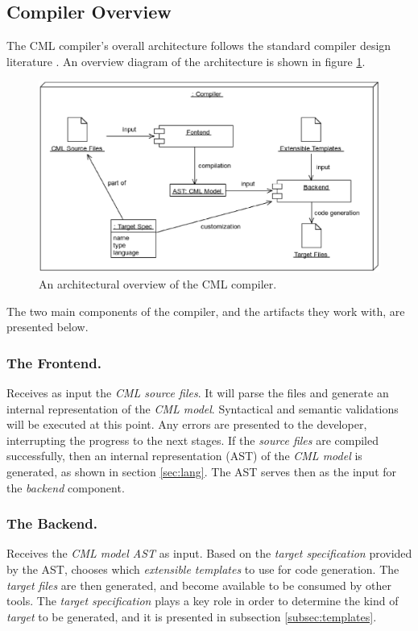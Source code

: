 \subsection{Compiler Overview}\label{subsec:overview}

The CML compiler's overall architecture follows the standard compiler design literature \cite{torben}. An overview diagram of the architecture is shown in figure \ref{fig:overview}.

\begin{figure}
\centering
\includegraphics[width=\textwidth]{compiler/figure-overview}
\caption{An architectural overview of the CML compiler.}
\label{fig:overview}
\end{figure}

The two main components of the compiler,
and the artifacts they work with,
are presented below.

\subsubsection{The Frontend.}
Receives as input the \emph{CML source files}.
It will parse the files and generate an internal representation of the \emph{CML model}.
Syntactical and semantic validations will be executed at this point.
Any errors are presented to the developer, interrupting the progress to the next stages.
If the \emph{source files} are compiled successfully, then an internal representation (AST) of the \emph{CML model} is generated, as shown in section \ref{sec:lang}.
The AST serves then as the input for the \emph{backend} component.

\subsubsection{The Backend.}
Receives the \emph{CML model AST} as input.
Based on the \emph{target specification} provided by the AST, chooses which \emph{extensible templates} to use for code generation.
The \emph{target files} are then generated, and become available to be consumed by other tools. The \emph{target specification} plays a key role in order to determine the kind of \emph{target} to be generated, and it is presented in subsection \ref{subsec:templates}.